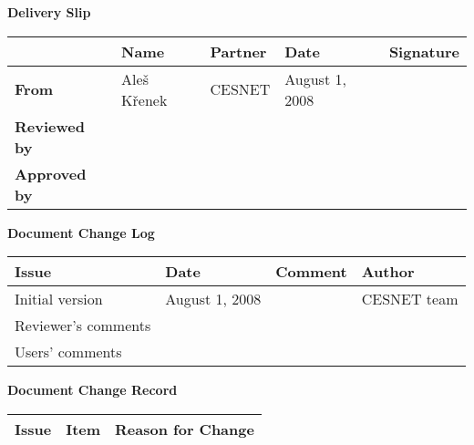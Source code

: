 %
%
%
%
\begin{center}
{\bf Delivery Slip}
\end{center}
\begin{tabularx}{\textwidth}{|l|l|l|X|X|}
\hline
           & {\bf Name} & {\bf Partner} & {\bf Date} & {\bf Signature} \\
\hline
{\bf From} & Ale\v{s} K\v{r}enek & CESNET & August 1, 2008 & \\
\hline
{\bf Reviewed by} & &  & & \\

\hline
{\bf Approved by} & & & & \\
\hline
\end{tabularx}

\begin{center}
{\bf Document Change Log}
\end{center}

\begin{tabularx}{\textwidth}{|l|l|X|X|}
\hline
{\bf Issue } & {\bf Date  } & {\bf Comment } & {\bf Author  } \\   \hline
Initial version & August 1, 2008 & & CESNET team \\ \hline
Reviewer's comments &&& \\ \hline
Users' comments &&& \\ 

\hline
\end{tabularx}

\begin{center}
{\bf Document Change Record}
\end{center}

\begin{tabularx}{\textwidth}{|l|l|X|}
\hline
{\bf Issue } & {\bf Item  } & {\bf Reason for Change } \\   \hline

\hline
\end{tabularx}


\clearpage
